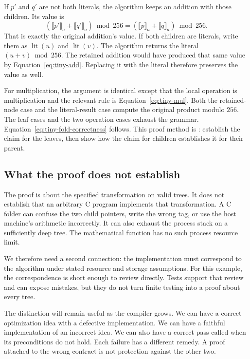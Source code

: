 If $p'$ and $q'$ are not both literals, the algorithm keeps an addition with those children.
Its value is
\[
  (\llbracket p'\rrbracket_a+\llbracket q'\rrbracket_a)\bmod256
  = (\llbracket p\rrbracket_a+\llbracket q\rrbracket_a)\bmod256.
\]
That is exactly the original addition's value.
If both children are literals, write them as $\operatorname{lit}(u)$ and $\operatorname{lit}(v)$.
The algorithm returns the literal $(u+v)\bmod256$.
The retained addition would have produced that same value by Equation~\ref{eq:tiny-add}.
Replacing it with the literal therefore preserves the value as well.

For multiplication, the argument is identical except that the local operation is multiplication and the relevant rule is Equation~\ref{eq:tiny-mul}.
Both the retained-node case and the literal-result case compute the original product modulo $256$.
The leaf cases and the two operation cases exhaust the grammar.
Equation~\ref{eq:tiny-fold-correctness} follows.
This proof method is : establish the claim for the leaves, then show how the claim for children establishes it for their parent.

\subsection{What the proof does not establish}
\label{sec:tiny-proof-boundary}

The proof is about the specified transformation on valid trees.
It does not establish that an arbitrary C program implements that transformation.
A C folder can confuse the two child pointers, write the wrong tag, or use the host machine's arithmetic incorrectly.
It can also exhaust the process stack on a sufficiently deep tree.
The mathematical function has no such process resource limit.

We therefore need a second connection: the implementation must correspond to the algorithm under stated resource and storage assumptions.
For this example, the correspondence is short enough to review directly.
Tests support that review and can expose mistakes, but they do not turn finite testing into a proof about every tree.

The distinction will remain useful as the compiler grows.
We can have a correct optimization idea with a defective implementation.
We can have a faithful implementation of an incorrect idea.
We can also have a correct pass called when its preconditions do not hold.
Each failure has a different remedy.
A proof attached to the wrong contract is not protection against the other two.

